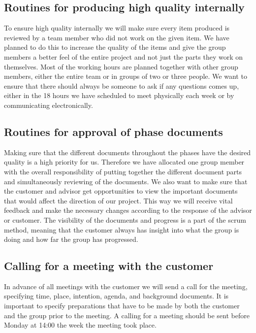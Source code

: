 \newpage

\subsection{Routines for producing high quality internally}
To ensure high quality internally we will make sure every item produced is reviewed by a team member who did not work on the given item. We have planned to do this to increase the quality of the items and give the group members a better feel of the entire project and not just the parts they work on themselves.
\newline
\newline
Most of the working hours are planned together with other group members, either the entire team or in groups of two or three people. We want to ensure that there should always be someone to ask if any questions comes up, either in the 18 hours we have scheduled to meet physically each week or by communicating electronically. 

\subsection{Routines for approval of phase documents}
Making sure that the different documents throughout the phases have the desired quality is a high priority for us. Therefore we have allocated one group member with the overall responsibility of putting together the different document parts and simultaneously reviewing of the documents. 
\newline
\newline 
We also want to make sure that the customer and advisor get opportunities to view the important documents that would affect the direction of our project. This way we will receive vital feedback and make the necessary changes according to the response of the advisor or customer. 
\newline
\newline
The visibility of the documents and progress is a part of the scrum method, meaning that the customer always has insight into what the group is doing and how far the group has progressed.

\subsection{Calling for a meeting with the customer}
In advance of all meetings with the customer we will send a call for the meeting, specifying time, place, intention, agenda, and background documents. It is important to specify preparations that have to be made by both the customer and the group prior to the meeting.
\newline
\newline
A calling for a meeting should be sent before Monday at 14:00 the week the meeting took place.

